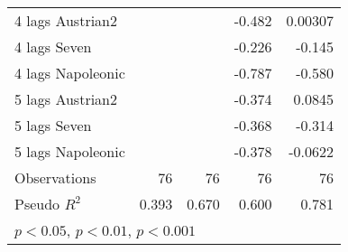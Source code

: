 \begin{table}[htbp]
\begin{tabular}{l*{4}{D{.}{.}{-1}}}
4 lags Austrian2    &                     &                     &      -0.482\sym{**} &     0.00307         \\
4 lags Seven        &                     &                     &      -0.226\sym{*}  &      -0.145\sym{*}  \\
4 lags Napoleonic   &                     &                     &      -0.787\sym{**} &      -0.580\sym{***}\\
5 lags Austrian2    &                     &                     &      -0.374\sym{*}  &      0.0845         \\
5 lags Seven        &                     &                     &      -0.368\sym{***}&      -0.314\sym{***}\\
5 lags Napoleonic   &                     &                     &      -0.378         &     -0.0622         \\
\midrule
Observations        &          76         &          76         &          76         &          76         \\
Pseudo \(R^{2}\)    &       0.393         &       0.670         &       0.600         &       0.781         \\
\bottomrule
{}\\
\end{tabular}
\end{table}
